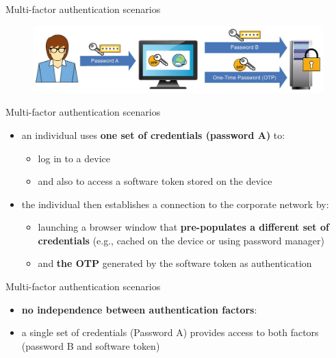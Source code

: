 \documentclass[pdf]{beamer}
\begin{document}
\begin{frame}{Multi-factor authentication scenarios}

\begin{figure}[t]
\centering
\includegraphics[scale=0.35]{Images/scenario2}
\end{figure}

\end{frame}



\begin{frame}{Multi-factor authentication scenarios}
\begin{itemize}
\item
an individual uses \textbf{one set of credentials (password A)} to:
\begin{itemize}
\item
log in to a device
\item
and also to access a software token stored on the device
\end{itemize}
\item
the individual then establishes a connection to the corporate network by:
\begin{itemize}
\item
launching a browser window that \textbf{pre-populates a different set of credentials} (e.g., cached on the device or using password manager)
\item
and \textbf{the OTP} generated by the software token as authentication
\end{itemize}
\end{itemize}
\end{frame}



\begin{frame}{Multi-factor authentication scenarios}
\begin{itemize}
\item
\textbf{no independence between authentication factors}:

\item
a single set of credentials (Password A) provides access to both factors (password B and software token)
\end{itemize}
\end{frame}
\end{document}
